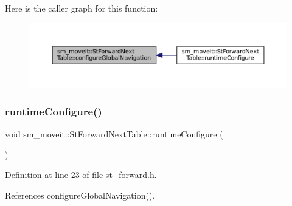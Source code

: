 Here is the caller graph for this function\+:
\nopagebreak
\begin{figure}[H]
\begin{center}
\leavevmode
\includegraphics[width=350pt]{structsm__moveit_1_1StForwardNextTable_ac3b63f25fad5cecd8faa51b427719d07_icgraph}
\end{center}
\end{figure}
\mbox{\label{structsm__moveit_1_1StForwardNextTable_a4f6c466efdb91b0eb9aaee71f87a4fc4}} 
\subsubsection{\texorpdfstring{runtime\+Configure()}{runtimeConfigure()}}
{\footnotesize\ttfamily void sm\+\_\+moveit\+::\+St\+Forward\+Next\+Table\+::runtime\+Configure (\begin{DoxyParamCaption}{ }\end{DoxyParamCaption})\hspace{0.3cm}{\ttfamily [inline]}}



Definition at line 23 of file st\+\_\+forward.\+h.



References configure\+Global\+Navigation().


